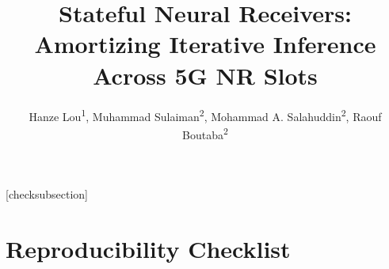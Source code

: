 \documentclass[letterpaper]{article} %
\title{Stateful Neural Receivers: Amortizing Iterative Inference Across 5G NR Slots}
\author{
    Hanze Lou\textsuperscript{\rm 1},
    Muhammad Sulaiman\textsuperscript{\rm 2},
    Mohammad A. Salahuddin\textsuperscript{\rm 2},
    Raouf Boutaba\textsuperscript{\rm 2}
}
\begin{document}
\maketitle













\iffalse
\setlength{\leftmargini}{20pt}
\makeatletter\def\@listi{\leftmargin\leftmargini \topsep .5em \parsep .5em \itemsep .5em}
\def\@listii{\leftmargin\leftmarginii \labelwidth\leftmarginii \advance\labelwidth-\labelsep \topsep .4em \parsep .4em \itemsep .4em}
\def\@listiii{\leftmargin\leftmarginiii \labelwidth\leftmarginiii \advance\labelwidth-\labelsep \topsep .4em \parsep .4em \itemsep .4em}\makeatother

\setcounter{secnumdepth}{0}
\renewcommand\thesubsection{\arabic{subsection}}
\renewcommand\labelenumi{\thesubsection.\arabic{enumi}}

[checksubsection]

\newcommand{\checksubsection}[1]{%
  \refstepcounter{checksubsection}%
  \paragraph{\arabic{checksubsection}. #1}%
  \setcounter{checkitem}{0}%
}

\newcommand{\checkitem}{%
  \refstepcounter{checkitem}%
  \item[\arabic{checksubsection}.\arabic{checkitem}.]%
}
\newcommand{\question}[2]{\normalcolor\checkitem #1 #2 \color{blue}}
\newcommand{\ifyespoints}[1]{\makebox[0pt][l]{\hspace{-15pt}\normalcolor #1}}

\section*{Reproducibility Checklist}
\end{document}
